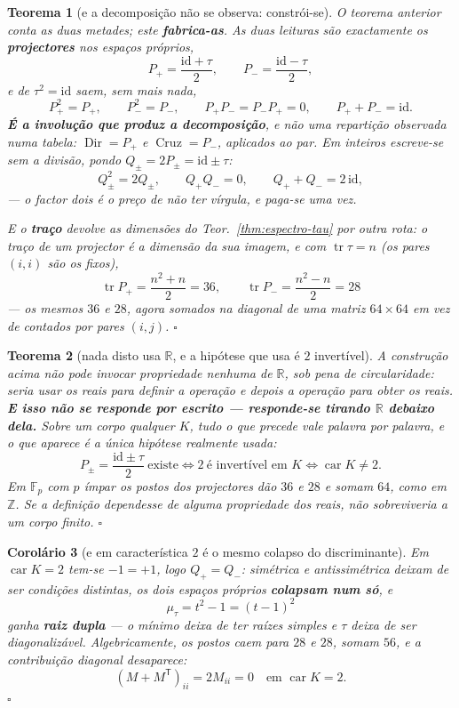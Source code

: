 \documentclass[11pt,a4paper]{article}
\newtheorem{teorema}{Teorema}
\newtheorem{corolario}[teorema]{Corolário}
\begin{document}
\begin{teorema}[e a decomposição não se observa: constrói-se]\label{thm:projectores}
O teorema anterior \emph{conta} as duas metades; este \textbf{fabrica-as}. As duas
leituras são exactamente os \textbf{projectores} nos espaços próprios,
\[
\boxed{\;P_{+}=\frac{\mathrm{id}+\tau}{2},
\qquad
P_{-}=\frac{\mathrm{id}-\tau}{2},\;}
\]
e de $\tau^{2}=\mathrm{id}$ saem, sem mais nada,
\[
P_{+}^{2}=P_{+},\qquad
P_{-}^{2}=P_{-},\qquad
P_{+}P_{-}=P_{-}P_{+}=0,\qquad
P_{+}+P_{-}=\mathrm{id}.
\]
\textbf{É a involução que produz a decomposição}, e não uma repartição observada numa
tabela: $\operatorname{Dir}=P_{+}$ e $\operatorname{Cruz}=P_{-}$, aplicados ao par.
Em inteiros escreve-se sem a divisão, pondo $Q_{\pm}=2P_{\pm}=\mathrm{id}\pm\tau$:
\[
Q_{\pm}^{2}=2Q_{\pm},\qquad Q_{+}Q_{-}=0,\qquad Q_{+}+Q_{-}=2\,\mathrm{id},
\]
--- o factor dois é o preço de não ter vírgula, e paga-se uma vez.

E o \textbf{traço} devolve as dimensões do Teor.~\ref{thm:espectro-tau} por outra rota:
o traço de um projector é a dimensão da sua imagem, e com $\operatorname{tr}\tau=n$
(os pares $(i,i)$ são os fixos),
\[
\boxed{\;\operatorname{tr}P_{+}=\frac{n^{2}+n}{2}=36,
\qquad
\operatorname{tr}P_{-}=\frac{n^{2}-n}{2}=28\;}
\]
--- os mesmos $36$ e $28$, agora somados na diagonal de uma matriz $64\times64$ em vez de
contados por pares $(i,j)$. $\square$
\end{teorema}

\begin{teorema}[nada disto usa $\mathbb{R}$, e a hipótese que usa é $2$ invertível]\label{thm:nao-circular}
A construção acima não pode invocar propriedade nenhuma de $\mathbb{R}$, sob pena de
circularidade: seria usar os reais para definir a operação e depois a operação para
obter os reais. \textbf{E isso não se responde por escrito --- responde-se tirando
$\mathbb{R}$ debaixo dela.} Sobre um corpo qualquer $K$, tudo o que precede vale
palavra por palavra, e o que aparece é a \emph{única} hipótese realmente usada:
\[
\boxed{\;P_{\pm}=\frac{\mathrm{id}\pm\tau}{2}\ \text{existe}
\iff 2\ \text{é invertível em } K
\iff \operatorname{car}K\neq2 . \;}
\]
Em $\mathbb{F}_p$ com $p$ ímpar os postos dos projectores dão $36$ e $28$ e somam $64$,
como em $\mathbb{Z}$. \emph{Se a definição dependesse de alguma propriedade dos reais,
não sobreviveria a um corpo finito.} $\square$
\end{teorema}

\begin{corolario}[e em característica $2$ é o mesmo colapso do discriminante]\label{cor:car2}
Em $\operatorname{car}K=2$ tem-se $-1=+1$, logo $Q_{+}=Q_{-}$: simétrica e
antissimétrica deixam de ser condições distintas, os dois espaços próprios
\textbf{colapsam num só}, e
\[
\mu_\tau=t^{2}-1=(t-1)^{2}
\]
ganha \textbf{raiz dupla} --- o mínimo deixa de ter raízes simples e $\tau$ deixa de ser
diagonalizável. \emph{Algebricamente}, os postos caem para $28$ e $28$, somam $56$, e a
contribuição diagonal desaparece:
\[
\boxed{\;(M+M^{\mathsf T})_{ii}=2M_{ii}=0\quad\text{em }\operatorname{car}K=2 .\;}
\]
$\square$
\end{corolario}
\end{document}
